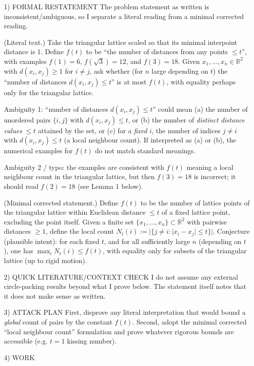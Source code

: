 1) FORMAL RESTATEMENT
The problem statement as written is inconsistent/ambiguous, so I separate a literal reading from a minimal corrected reading.

(Literal text.)
Take the triangular lattice scaled so that its minimal interpoint distance is $1$. Define $f(t)$ to be
``the number of distances from any points $\le t$'', with examples $f(1)=6$, $f(\sqrt3)=12$, and $f(3)=18$.
Given $x_1,\ldots,x_n\in\mathbb{R}^2$ with $d(x_i,x_j)\ge 1$ for $i\neq j$, ask whether (for $n$ large depending on $t$) the
``number of distances $d(x_i,x_j)\le t$'' is at most $f(t)$, with equality perhaps only for the triangular lattice.

Ambiguity 1: ``number of distances $d(x_i,x_j)\le t$'' could mean
(a) the number of unordered pairs $\{i,j\}$ with $d(x_i,x_j)\le t$, or
(b) the number of \emph{distinct distance values} $\le t$ attained by the set, or
(c) for a \emph{fixed} $i$, the number of indices $j\neq i$ with $d(x_i,x_j)\le t$ (a local neighbour count).
If interpreted as (a) or (b), the numerical examples for $f(t)$ do not match standard meanings.

Ambiguity 2 / typo: the examples are consistent with $f(t)$ meaning a local neighbour count in the triangular lattice,
but then $f(3)=18$ is incorrect; it should read $f(2)=18$ (see Lemma 1 below).

(Minimal corrected statement.)
Define $f(t)$ to be the number of lattice points of the triangular lattice within Euclidean distance $\le t$ of a fixed lattice point, excluding the point itself.
Given a finite set $\{x_1,\ldots,x_n\}\subset\mathbb{R}^2$ with pairwise distances $\ge 1$, define the local count
$N_t(i):=|\{j\neq i: |x_i-x_j|\le t\}|$.
Conjecture (plausible intent): for each fixed $t$, and for all sufficiently large $n$ (depending on $t$), one has
$\max_i N_t(i)\le f(t)$, with equality only for subsets of the triangular lattice (up to rigid motion).

2) QUICK LITERATURE/CONTEXT CHECK
I do not assume any external circle-packing results beyond what I prove below. The statement itself notes that it does not make sense as written.

3) ATTACK PLAN
First, disprove any literal interpretation that would bound a \emph{global} count of pairs by the constant $f(t)$.
Second, adopt the minimal corrected ``local neighbour count'' formulation and prove whatever rigorous bounds are accessible (e.g. $t=1$ kissing number).

4) WORK

